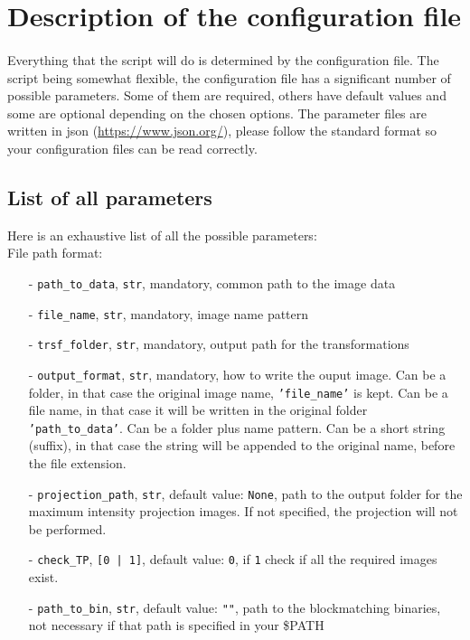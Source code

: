 \documentclass[10pt,a4paper]{book}
\newcommand{\option}[1]{{\texttt{'#1'}}}
\begin{document}
\section{Description of the configuration file}
\paragraph{}Everything that the script will do is determined by the configuration file. The script being somewhat flexible, the configuration file has a significant number of possible parameters. Some of them are required, others have default values and some are optional depending on the chosen options. The parameter files are written in json (\url{https://www.json.org/}), please follow the standard format so your configuration files can be read correctly.
\subsection{List of all parameters}
Here is an exhaustive list of all the possible parameters:\\
File path format:
\begin{itemize}
\item[-] \texttt{path\_to\_data}, \texttt{str}, mandatory, common path to the image data
\item[-] \texttt{file\_name}, \texttt{str}, mandatory, image name pattern
\item[-] \texttt{trsf\_folder}, \texttt{str}, mandatory, output path for the transformations
\item[-] \texttt{output\_format}, \texttt{str}, mandatory, how to write the ouput image. Can be a folder, in that case the original image name, \option{file\_name} is kept. Can be a file name, in that case it will be written in the original folder \option{path\_to\_data}. Can be a folder plus name pattern. Can be a short string (suffix), in that case the string will be appended to the original name, before the file extension.
\item[-] \texttt{projection\_path}, \texttt{str}, default value: \texttt{None}, path to the output folder for the maximum intensity projection images. If not specified, the projection will not be performed.
\item[-] \texttt{check\_TP}, \texttt{[0 | 1]}, default value: \texttt{0}, if \texttt{1} check if all the required images exist.
\item[-] \texttt{path\_to\_bin}, \texttt{str}, default value: \texttt{""}, path to the blockmatching binaries, not necessary if that path is specified in your \$PATH
\end{itemize}~\\
\end{document}

